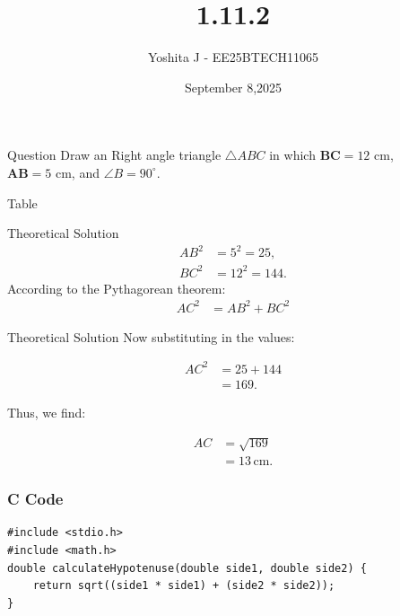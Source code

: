 \documentclass{beamer}
\begin{document}
\title 
{1.11.2}
\date{September 8,2025}


\author 
{Yoshita J - EE25BTECH11065}






\frame{\titlepage}
\begin{frame}{Question}
 Draw an Right angle  triangle $\triangle ABC$ in which $\boldsymbol{BC} = 12 \text{ cm}$, $\boldsymbol{AB} = 5 \text{ cm}$, and $\angle B = 90^\circ$.

\end{frame}



\begin{frame}{Table}
    \begin{table}[h!]    
      \centering
      
      \caption{}
    \end{table}
\end{frame}
\begin{frame}{Theoretical Solution}
\begin{align}
      AB^2 & = 5^2 = 25, \\
      BC^2 & = 12^2 = 144.
   \end{align}
   According to the Pythagorean theorem:
   \begin{align}
      AC^2 & = AB^2 + BC^2 
   \end{align}
\end{frame}

\begin{frame}{Theoretical Solution}
Now substituting in the values:

   \begin{align}
      AC^2 & = 25 + 144 \\
      & = 169.
   \end{align}

Thus, we find:

   \begin{align}
      AC & = \sqrt{169} \\
      & = 13 \, \text{cm}.
   \end{align}
\end{frame}


\begin{frame}[fragile]
    \frametitle{C Code}

    \begin{lstlisting}
#include <stdio.h>
#include <math.h> 
double calculateHypotenuse(double side1, double side2) {
    return sqrt((side1 * side1) + (side2 * side2));
}

    \end{lstlisting}
\end{frame}
\end{document}
